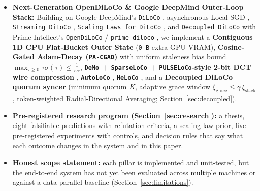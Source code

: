 \documentclass[11pt,a4paper]{article}
\begin{document}
\begin{itemize}[leftmargin=1.8em]
    \item \textbf{Next-Generation OpenDiLoCo \& Google DeepMind Outer-Loop Stack:} Building on Google DeepMind's \texttt{DiLoCo} \cite{douillard2023diloco}, asynchronous Local-SGD \cite{liu2024asynclocalsgd}, \texttt{Streaming DiLoCo} \cite{douillard2025streamingdiloco}, \texttt{Scaling Laws for DiLoCo} \cite{charles2025scalingdiloco}, and \texttt{Decoupled DiLoCo} \cite{douillard2026decoupled} with Prime Intellect's \texttt{OpenDiLoCo} / \texttt{prime-diloco} \cite{jaghouar2024opendiloco}, we implement a \textbf{Contiguous 1D CPU Flat-Bucket Outer State} (\texttt{0\,B} extra GPU VRAM), \textbf{Cosine-Gated Adam-Decay (\texttt{PA-CGAD})} \cite{shah2026cgad} with uniform staleness bias bound $\max_{\tau \ge 0} \tau \sigma(\tau) \le \frac{1}{e\alpha}$, \textbf{\texttt{DeMo} + \texttt{SparseLoCo} + \texttt{PULSELoCo}-style 2-bit DCT wire compression} \cite{peng2024demo,sarfi2025sparseloco,miahi2026pulseloco}, \textbf{\texttt{AutoLoCo}} \cite{he2026autoloco}, \textbf{\texttt{HeLoCo}} \cite{asif2026heloco}, and a \textbf{Decoupled DiLoCo quorum syncer} (minimum quorum $K$, adaptive grace window $\xi_{\text{grace}} \le \gamma\,\xi_{\text{slack}}$, token-weighted Radial-Directional Averaging; Section~\ref{sec:decoupled}).
    \item \textbf{Pre-registered research program (Section~\ref{sec:research}):} a thesis, eight falsifiable predictions with refutation criteria, a scaling-law prior, five pre-registered experiments with controls, and decision rules that say what each outcome changes in the system and in this paper.
    \item \textbf{Honest scope statement:} each pillar is implemented and unit-tested, but the end-to-end system has not yet been evaluated across multiple machines or against a data-parallel baseline (Section~\ref{sec:limitations}).
\end{itemize}
\end{document}
